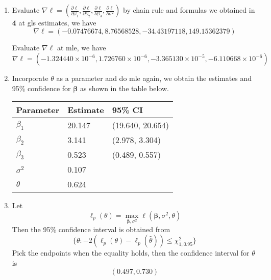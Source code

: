 \documentclass{article}
\begin{document}
\begin{enumerate}[leftmargin = 0 em, label = \arabic*., font = \bfseries]
    
    
    
	\item 
	Evaluate $\nabla \ell = (\frac{\partial\ell}{\partial \beta_1}, \frac{\partial\ell}{\partial \beta_2}, \frac{\partial\ell}{\partial \beta_3}, \frac{\partial\ell}{\partial \sigma^2})$ by chain rule and formulas we obtained in \textbf{4} at gls estimates, we have
	\[\nabla \ell = (-0.07476674,8.76568528,-34.43197118,149.15362379)\]

	Evaluate $\nabla \ell$ at mle, we have
	\[\nabla \ell = (-1.324440\times 10^{-6}  ,1.726760 \times 10^{-6} ,-3.365130\times 10^{-5} ,-6.110668\times 10^{-6})\]


	\item Incorporate $\theta$ as a parameter and do mle again, we obtain the estimates and 95\% confidence for $\bm \beta$ as shown in the table below.
		\begin{center}
	\begin{tabular}{lll}
		 \toprule
		 Parameter & Estimate & 95\% CI\\
		 \midrule
		 $\beta_1$ & 20.147 & (19.640, 20.654)\\
		 $\beta_2$ & 3.141 & (2.978, 3.304)\\
		 $\beta_3$ & 0.523 & (0.489, 0.557)\\
		 $\sigma^2$ & 0.107 & \\
		 $\theta$ & 0.624 & \\
		 \bottomrule
		\end{tabular}
	\end{center}

	\item Let 
	\[\ell_p(\theta) = \max_{\bm \beta, \sigma^2} \ell(\bm \beta, \sigma^2, \theta)\]
	Then the 95\% confidence interval is obtained from
	\[\{\theta: -2(\ell_p(\theta) - \ell_p(\hat{\theta})) \leq \chi_{1, 0.95}^2\}\]
	Pick the endpoints when the equality holds, then the confidence interval for $\theta$ is
	\[(0.497, 0.730)\]


 	\end{enumerate}



 	


	
	
	
	
\end{document}
